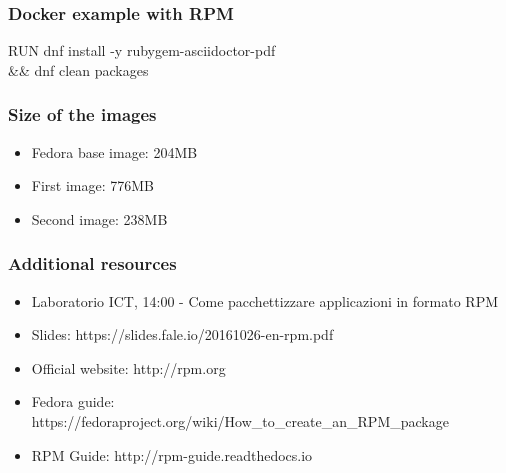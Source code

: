 \documentclass[t,aspectratio=169]{beamer}
\begin{document}
\begin{frame}[fragile]
    \frametitle{Docker example with RPM}
    \begin{semiverbatim}
RUN dnf install -y rubygem-asciidoctor-pdf \\
  \&\& dnf clean packages
    \end{semiverbatim}
\end{frame}

\begin{frame}
    \frametitle{Size of the images}
    \begin{itemize}
        \item Fedora base image: 204MB
        \item<2-> First image: 776MB
        \item<3-> Second image: 238MB
    \end{itemize}
\end{frame}

\begin{frame}
    \frametitle{Additional resources}
    \begin{itemize}
        \item Laboratorio ICT, 14:00 - Come pacchettizzare applicazioni in formato RPM
        \item Slides: https://slides.fale.io/20161026-en-rpm.pdf
        \item Official website: http://rpm.org
        \item Fedora guide: https://fedoraproject.org/wiki/How\_to\_create\_an\_RPM\_package
        \item RPM Guide: http://rpm-guide.readthedocs.io
    \end{itemize}
\end{frame}

\end{document}

